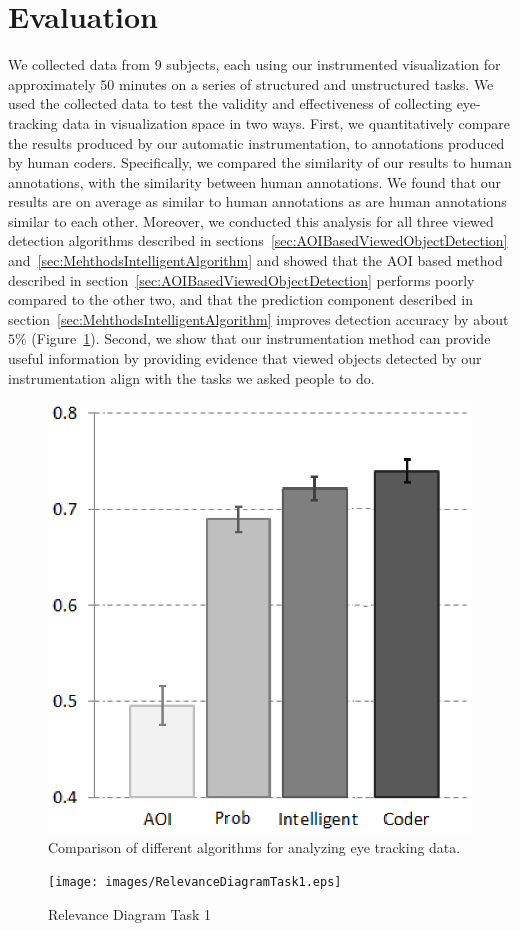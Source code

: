 \section{Evaluation}
\label{sec:Evaluation}
We collected data from $9$ subjects, each using our instrumented visualization for approximately $50$ minutes on a series of structured and unstructured tasks. We used the collected data to test the validity and effectiveness of collecting eye-tracking data in visualization space in two ways. 
First, we quantitatively compare the results produced by our automatic instrumentation, to annotations produced by human coders. Specifically, we compared the similarity of our results to human annotations, with the similarity between human annotations. We found that our results are on average as similar to human annotations as are human annotations similar to each other. Moreover, we conducted this analysis for all three viewed detection algorithms described in sections~\ref{sec:AOIBasedViewedObjectDetection} and~\ref{sec:MehthodsIntelligentAlgorithm} and showed that the AOI based method described in section~\ref{sec:AOIBasedViewedObjectDetection} performs poorly compared to the other two, and that the prediction component described in section~\ref{sec:MehthodsIntelligentAlgorithm} improves detection accuracy by about $5\%$  (Figure~\ref{fig:algosComparison}). Second, we show that our instrumentation method can provide useful information by providing evidence that viewed objects detected by our instrumentation align with the tasks we asked people to do.

\begin{figure}[htb]
  \centering
  \includegraphics[width=0.6\linewidth]{images/algosComparison.eps}
  \caption{Comparison of different algorithms for analyzing eye tracking data.}
	\label{fig:algosComparison}
\end{figure}
\begin{figure}[htb]
  \centering
  \texttt{[image: images/RelevanceDiagramTask1.eps]}
  \caption{Relevance Diagram Task 1}
	\label{fig:RelevanceDiagramTask1}
\end{figure}

